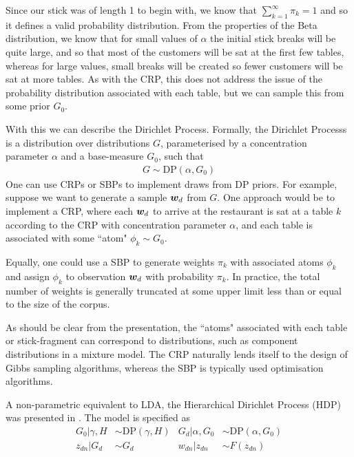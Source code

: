 Since our stick was of length 1 to begin with, we know that $\sum_{k=1}^{\infty} \pi_k = 1$ and so it defines a valid probability distribution. From the properties of the Beta distribution, we know that for small values of $\alpha$ the initial stick breaks will be quite large, and so that most of the customers will be sat at the first few tables, whereas for large values, small breaks will be created so fewer customers will be sat at more tables. As with the CRP, this does not address the issue of the probability distribution associated with each table, but we can sample this from some prior $G_0$.

With this we can describe the Dirichlet Process. Formally, the Dirichlet Processs is a distribution over distributions $G$, parameterised by a concentration parameter $\alpha$ and a base-measure $G_0$, such that
\begin{align}
G \sim \text{DP}\left(\alpha, G_0\right)
\end{align}
One can use CRPs or SBPs to implement draws from DP priors. For example, suppose we want to generate a sample ${ \bm w_d }$ from $G$. One approach would be to implement a CRP\cite{Neal2000}, where each ${ \bm w_d }$ to arrive at the restaurant is sat at a table $k$ according to the CRP with concentration parameter $\alpha$, and each table is associated with some ``atom" $\phi_k \sim G_0$.

Equally, one could use a SBP\cite{Sethuraman1994} to generate weights $\pi_k$ with associated atoms $\phi_k$ and assign $\phi_k$ to observation ${ \bm w_d }$ with probability $\pi_k$. In practice, the total number of weights is generally truncated at some upper limit less than or equal to the size of the corpus. 

As should be clear from the presentation, the ``atoms" associated with each table or stick-fragment can correspond to distributions, such as component distributions in a mixture model. The CRP naturally lends itself to the design of Gibbs sampling algorithms, whereas the SBP is typically used optimisation algorithms. 

A non-parametric equivalent to LDA, the Hierarchical Dirichlet Process (HDP) was presented in \cite{Teh2006b}. The model is specified as
\begin{align}
G_0 | \gamma, H & \sim \text{DP}\left(\gamma, H \right) &
G_d | \alpha, G_0 & \sim \text{DP}\left(\alpha, G_0\right) \\
z_{dn} |G_d &\sim G_d & w_{dn} | z_{dn} & \sim F(z_{dn})
\end{align}

